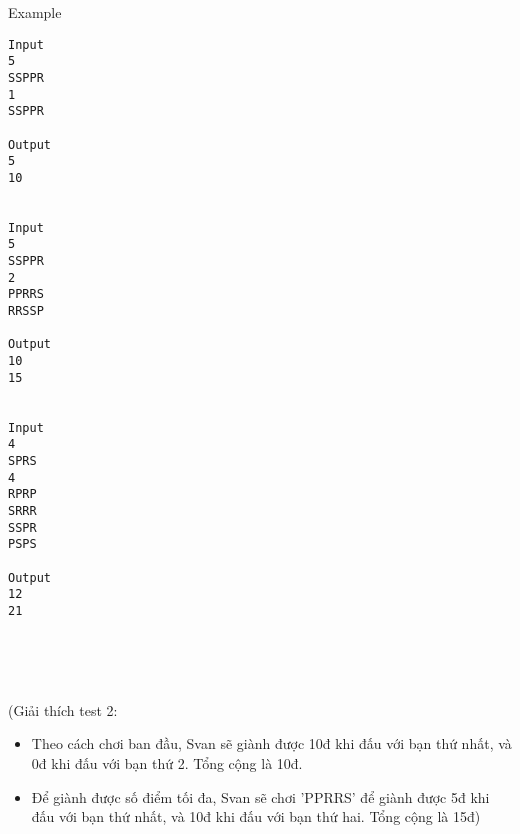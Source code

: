 Example
\begin{verbatim}
Input
5
SSPPR
1
SSPPR

Output
5
10


Input
5
SSPPR
2
PPRRS
RRSSP

Output
10
15


Input
4
SPRS
4
RPRP
SRRR
SSPR
PSPS

Output
12
21
\end{verbatim}

 

 

(Giải thích test 2:
\begin{itemize}
	\item Theo cách chơi ban đầu, Svan sẽ giành được 10đ khi đấu với bạn thứ nhất, và 0đ khi đấu với bạn thứ 2. Tổng cộng là 10đ.
	\item Để giành được số điểm tối đa, Svan sẽ chơi 'PPRRS' để giành được 5đ khi đấu với bạn thứ nhất, và 10đ khi đấu với bạn thứ hai. Tổng cộng là 15đ)
\end{itemize}

 